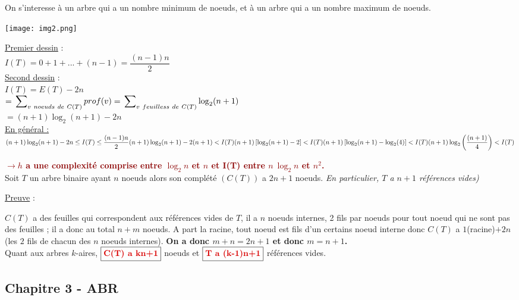 \documentclass{article}
\newcommand{\dred}[1]{\textcolor{darkred}{\textbf{#1}}}
\begin{document}
On s'interesse à un arbre qui a un nombre minimum de noeuds, et à un arbre qui a un nombre maximum de noeuds.

\texttt{[image: img2.png]}

\noindent\underline{Premier dessin} : \\ $I(T) = 0+1+...+(n-1) = \dfrac{(n-1)n}{2}$ \\
\underline{Second dessin} : \\ $I(T) = E(T) - 2n$ \\
$ = \sideset{}{_{v\ noeuds\ de\ C(T)}}\sum{prof(v)} = \sideset{}{_{v\ feuilless\ de\ C(T)}}\sum{\log_2(n+1)}$ \\
$ = (n+1)\log_2(n+1)-2n$ \\

\noindent\underline{En général : } \\
$(n+1)\log_2(n+1)-2n \leq I(T) \leq \dfrac{(n-1)n}{2} \\
(n+1)\log_2(n+1)-2(n+1) < I(T)  \\ 
(n+1) \left[ \log_2(n+1) - 2 \right] < I(T) \\
(n+1) \left[ \log_2(n+1) - \log_2(4) \right] < I(T)  \\
(n+1) \log_2\left(\dfrac{(n+1)}{4} \right) < I(T) \\$

\dred{$\rightarrow h$ a une complexité comprise entre $\log_2n$ et $n$ et I(T) entre $n\ \log_2n$ et $n^2$.} \\

Soit $T$ un arbre binaire ayant $n$ noeuds alors son complété $(C(T))$ a $2n+1$ noeuds. \textit{En particulier, 
$T$ a $n+1$ références vides)}

\noindent\underline{Preuve} :

$C(T)$ a des feuilles qui correspondent aux références vides de $T$, il a $n$ noeuds internes, 2 fils par noeuds 
pour tout noeud qui ne sont pas des feuilles ; il a donc au total $n+m$ noeuds. A part la racine, tout noeud est 
fils d'un certains noeud interne donc $C(T)$ a $1$(racine)$+2n$ (les $2$ fils de chacun des $n$ noeuds internes).
\textbf{On a donc $m+n = 2n+1$ et donc $\boxed{m=n+1}$.} \\
Quant aux arbres $k$-aires, $\boxed{\dred{C(T)\ a\ kn+1}}$ noeuds et $\boxed{\dred{T\ a\ (k-1)n+1}}$ références 
vides.

\subsection{Chapitre 3 - ABR}
\end{document}
